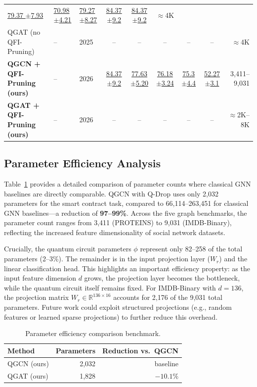 \documentclass[journal]{IEEEtran}
\begin{document}
{\begin{table}[t]
{\begin{tabular}{l l l *{5}{c} r}
      \underline{79.37 $\pm$7.93} & \underline{70.98 $\pm$4.21} & \underline{79.27 $\pm$8.27} & \underline{84.37 $\pm$9.2} & \underline{84.37 $\pm$9.2} & $\approx$4K \\
    QGAT (no QFI-Pruning)   & -- & 2025 &
      -- & -- & -- & -- & -- & $\approx$4K \\
    \textbf{QGCN + QFI-Pruning (ours)} & -- & 2026 &
      \underline{84.37 $\pm$9.2} & \underline{77.63 $\pm$5.20} &
      \underline{76.18 $\pm$3.24} & \underline{75.3 $\pm$4.4} &
      \underline{52.27 $\pm$3.1} & 3,411--9,031 \\
    \textbf{QGAT + QFI-Pruning (ours)} & -- & 2026 &
      -- & -- & -- & -- & -- & $\approx$2K--8K \\
    \bottomrule
  \end{tabular}}
\end{table}}

\subsection{Parameter Efficiency Analysis}

Table~\ref{tab:params} provides a detailed comparison of parameter counts where classical GNN baselines are directly
comparable. QGCN with Q-Drop uses only 2,032 parameters for the smart
contract task, compared to 66,114--263,451 for classical GNN baselines---a
reduction of \textbf{97--99\%}. Across the five graph benchmarks, the
parameter count ranges from 3,411 (PROTEINS) to 9,031 (IMDB-Binary),
reflecting the increased feature dimensionality of social network datasets.

Crucially, the quantum circuit parameters $\phi$ represent only 82--258
of the total parameters (2--3\%). The remainder is in the input projection
layer ($W_r$) and the linear classification head. This highlights an
important efficiency property: as the input feature dimension $d$ grows,
the projection layer becomes the bottleneck, while the quantum circuit
itself remains fixed. For IMDB-Binary with $d=136$, the projection matrix
$W_r \in \mathbb{R}^{136 \times 16}$ accounts for 2,176 of the 9,031
total parameters. Future work could exploit structured projections
(e.g., random features or learned sparse projections) to further reduce
this overhead.

{\renewcommand{\arraystretch}{1.2}
\begin{table}[t]
  \centering
  \caption{Parameter efficiency comparison benchmark.}
  \label{tab:params}
  \begin{tabular}{l r r}
    \toprule
    Method & Parameters & Reduction vs.\ QGCN \\
    \midrule

    \midrule
    QGCN (ours)             & 2,032    & baseline \\
    QGAT (ours)                      & 1,828    & $-10.1\%$ \\

    \bottomrule
  \end{tabular}
\end{table}}
\end{document}
